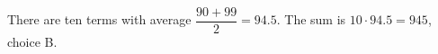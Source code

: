 There are ten terms with average $\dfrac{90+99}{2}=94.5$. The sum is $10\cdot94.5=\boxed{945}$, choice B.
